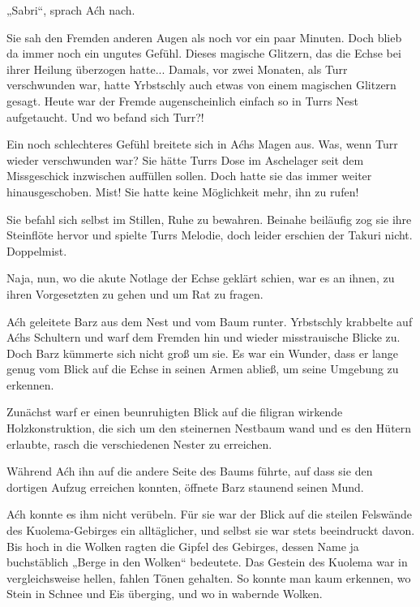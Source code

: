 „Sabri“, sprach Aćh nach.

Sie sah den Fremden anderen Augen als noch vor ein paar Minuten. Doch blieb da immer noch ein ungutes Gefühl. Dieses magische Glitzern, das die Echse bei ihrer Heilung überzogen hatte... Damals, vor zwei Monaten, als Turr verschwunden war, hatte Yrbstschly auch etwas von einem magischen Glitzern gesagt. Heute war der Fremde augenscheinlich einfach so in Turrs Nest aufgetaucht. Und wo befand sich Turr?!

Ein noch schlechteres Gefühl breitete sich in Aćhs Magen aus. Was, wenn Turr wieder verschwunden war? Sie hätte Turrs Dose im Aschelager seit dem Missgeschick inzwischen auffüllen sollen. Doch hatte sie das immer weiter hinausgeschoben. Mist! Sie hatte keine Möglichkeit mehr, ihn zu rufen!

Sie befahl sich selbst im Stillen, Ruhe zu bewahren. Beinahe beiläufig zog sie ihre Steinflöte hervor und spielte Turrs Melodie, doch leider erschien der Takuri nicht. Doppelmist.

Naja, nun, wo die akute Notlage der Echse geklärt schien, war es an ihnen, zu ihren Vorgesetzten zu gehen und um Rat zu fragen.\bigskip







Aćh geleitete Barz aus dem Nest und vom Baum runter. Yrbstschly krabbelte auf Aćhs Schultern und warf dem Fremden hin und wieder misstrauische Blicke zu. Doch Barz kümmerte sich nicht groß um sie. Es war ein Wunder, dass er lange genug vom Blick auf die Echse in seinen Armen abließ, um seine Umgebung zu erkennen.

Zunächst warf er einen beunruhigten Blick auf die filigran wirkende Holzkonstruktion, die sich um den steinernen Nestbaum wand und es den Hütern erlaubte, rasch die verschiedenen Nester zu erreichen.

Während Aćh ihn auf die andere Seite des Baums führte, auf dass sie den dortigen Aufzug erreichen konnten, öffnete Barz staunend seinen Mund.

Aćh konnte es ihm nicht verübeln. Für sie war der Blick auf die steilen Felswände des Kuolema-Gebirges ein alltäglicher, und selbst sie war stets beeindruckt davon. Bis hoch in die Wolken ragten die Gipfel des Gebirges, dessen Name ja buchstäblich „Berge in den Wolken“ bedeutete. Das Gestein des Kuolema war in vergleichsweise hellen, fahlen Tönen gehalten. So konnte man kaum erkennen, wo Stein in Schnee und Eis überging, und wo in wabernde Wolken.

